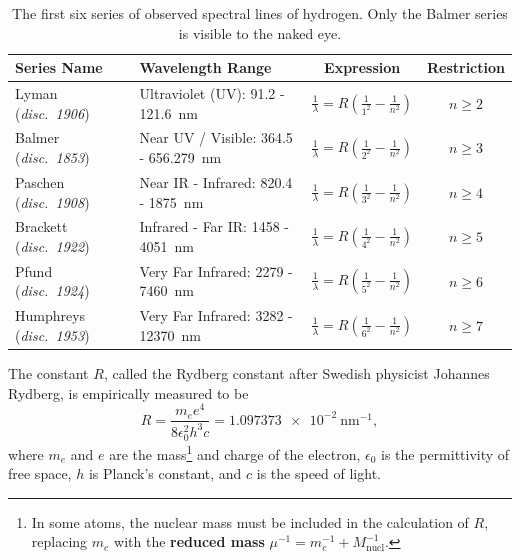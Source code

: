 \documentclass[addpoints]{physlabs}
\begin{document}
\begin{labsection}
\begin{theory}
\begin{table}[ht]
    \centering
    \renewcommand{\arraystretch}{1.2}
    \begin{tabular}{|p{2cm}|>{\centering\arraybackslash}p{3cm}|c|c|}
        \hline
        \rowcolor{gray!20}
        \textbf{Series Name} & \textbf{Wavelength Range} & \textbf{Expression} & \textbf{Restriction}
        \\
        \hline
        Lyman (\textsl{disc.~1906}) & Ultraviolet (UV): 91.2 - 121.6~nm& $\displaystyle{\frac{1}{\lambda} = R\left(\frac{1}{1^2} - \frac{1}{n^2}\right)}$ & $n\geq2$
        \\
        \hline
        Balmer (\textsl{disc.~1853}) & Near UV / Visible: 364.5 - 656.279~nm& $\displaystyle{\frac{1}{\lambda} = R\left(\frac{1}{2^2} - \frac{1}{n^2}\right)}$ & $n\geq3$
        \\
        \hline
        Paschen (\textsl{disc.~1908}) & Near IR - Infrared: 820.4 - 1875~nm& $\displaystyle{\frac{1}{\lambda} = R\left(\frac{1}{3^2} - \frac{1}{n^2}\right)}$ & $n\geq4$
        \\
        \hline
        Brackett (\textsl{disc.~1922}) & Infrared - Far IR: 1458 - 4051~nm& $\displaystyle{\frac{1}{\lambda} = R\left(\frac{1}{4^2} - \frac{1}{n^2}\right)}$ & $n\geq5$
        \\
        \hline
        Pfund (\textsl{disc.~1924}) & Very Far Infrared: 2279 - 7460~nm& $\displaystyle{\frac{1}{\lambda} = R\left(\frac{1}{5^2} - \frac{1}{n^2}\right)}$ & $n\geq6$
        \\
        \hline
        Humphreys (\textsl{disc.~1953}) & Very Far Infrared: 3282 - 12370~nm& $\displaystyle{\frac{1}{\lambda} = R\left(\frac{1}{6^2} - \frac{1}{n^2}\right)}$ & $n\geq7$
        \\
        \hline
    \end{tabular}
    \caption{The first six series of observed spectral lines of hydrogen. Only the Balmer series is visible to the naked eye.}
    \label{tab: hydrogen spectral series}
\end{table}

The constant $R$, called the Rydberg constant after Swedish physicist Johannes Rydberg, is empirically measured to be
%
\begin{equation}\label{eq: rydberg constant}
    R = \frac{m_e e^4}{8\epsilon_0^2h^3c} = \qty{1.097373e-2}{\nano\meter^{-1}},
\end{equation}
%
where $m_e$ and $e$ are the mass\footnote{In some atoms, the nuclear mass must be included in the calculation of $R$, replacing $m_e$ with the \textbf{reduced mass} $\mu^{-1}=m_e^{-1}+M_\text{nucl}^{-1}$.} and charge of the electron, $\epsilon_0$ is the permittivity of free space, $h$ is Planck's constant, and $c$ is the speed of light.


\end{theory}
\end{labsection}
\end{document}
